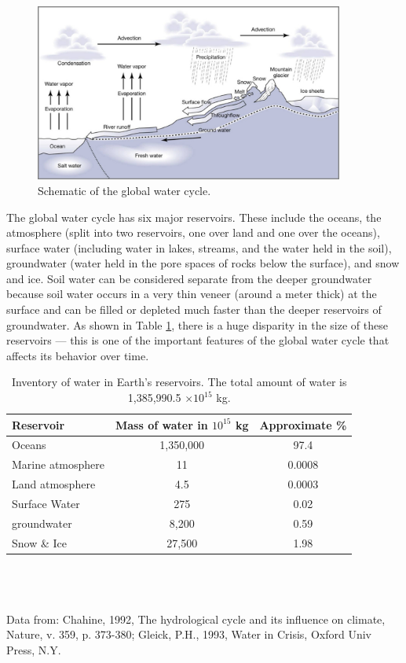 \documentclass[11pt,letterpaper]{article}
\begin{document}
\begin{figure}[h]
\begin{center}
\includegraphics[width=4in]{./globalwatercycle}
\caption{Schematic of the global water cycle.}
\end{center}
\label{fig:globalwatercycle}
\end{figure}

The global water cycle has six major reservoirs. These include the oceans, the atmosphere (split into two reservoirs, one over land and one over the oceans), surface water (including water in lakes, streams, and the water held in the soil), groundwater (water held in the pore spaces of rocks below the surface), and snow and ice. Soil water can be considered separate from the deeper groundwater because soil water occurs in a very thin veneer (around a meter thick) at the surface and can be filled or depleted much faster than the deeper reservoirs of groundwater. As shown in Table \ref{table:inventory}, there is a huge disparity in the size of these reservoirs --- this is one of the important features of the global water cycle that affects its behavior over time.

\begin{table}[h]
\caption{Inventory of water in Earth's reservoirs. The total amount of water is 1,385,990.5 $\times 10^{15}$ kg.\hspace{5cm}}
\begin{tabular}{l c c}\\
\hline
Reservoir & Mass of water in $10^{15}$ kg & Approximate \%\\
\hline
Oceans & 1,350,000 & 97.4\\
Marine atmosphere & 11 & 0.0008\\
Land atmosphere & 4.5 & 0.0003\\
Surface Water & 275 & 0.02\\
groundwater & 8,200 & 0.59\\
Snow \& Ice & 27,500 & 1.98\\
\hline
\end{tabular}\\\\\\
Data from: Chahine, 1992, The hydrological cycle and its influence on climate, Nature, v. 359, p. 373-380; 
Gleick, P.H., 1993, Water in Crisis, Oxford Univ Press, N.Y.
\label{table:inventory}
\end{table}
\end{document}
